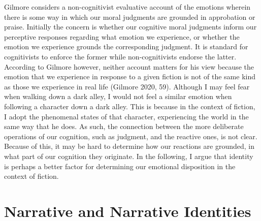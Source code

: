 \documentclass[12pt]{book}
\theoremstyle{definition}
\theoremstyle{remark}
\begin{document}
Gilmore considers a non-cognitivist evaluative account of the emotions wherein there is some way in which our moral judgments are grounded in approbation or praise. Initially the concern is whether our cognitive moral judgments inform our perceptive responses regarding what emotion we experience, or whether the emotion we experience grounds the corresponding judgment. It is standard for cognitivists to enforce the former while non-cognitivists endorse the latter. According to Gilmore however, neither account matters for his view because the emotion that we experience in response to a given fiction is not of the same kind as those we experience in real life (Gilmore 2020, 59). Although I may feel fear when walking down a dark alley, I would not feel a similar emotion when following a character down a dark alley. This is because in the context of fiction, I adopt the phenomenal states of that character, experiencing the world in the same way that he does. As such, the connection between the more deliberate operations of our cognition, such as judgment, and the reactive ones, is not clear. Because of this, it may be hard to determine how our reactions are grounded, in what part of our cognition they originate. In the following, I argue that identity is perhaps a better factor for determining our emotional disposition in the context of fiction.

\section{Narrative and Narrative Identities}\label{narrative-and-narrative-identities-1}
\end{document}
